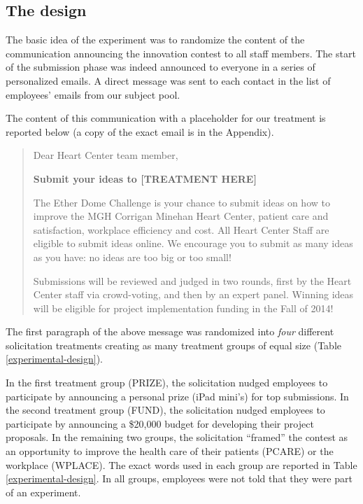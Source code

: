 \documentclass[11pt, titlepage]{article}
\begin{document}
\subsection{The design}\label{the-design}

The basic idea of the experiment was to randomize the content of the
communication announcing the innovation contest to all staff members.
The start of the submission phase was indeed announced to everyone in a
series of personalized emails. A direct message was sent to each contact
in the list of employees' emails from our subject pool.

The content of this communication with a placeholder for our treatment
is reported below (a copy of the exact email is in the Appendix).

\begin{quote}
Dear Heart Center team member,

\textbf{Submit your ideas to {[}TREATMENT HERE{]}}

The Ether Dome Challenge is your chance to submit ideas on how to
improve the MGH Corrigan Minehan Heart Center, patient care and
satisfaction, workplace efficiency and cost. All Heart Center Staff are
eligible to submit ideas online. We encourage you to submit as many
ideas as you have: no ideas are too big or too small!

Submissions will be reviewed and judged in two rounds, first by the
Heart Center staff via crowd-voting, and then by an expert panel.
Winning ideas will be eligible for project implementation funding in the
Fall of 2014!
\end{quote}

The first paragraph of the above message was randomized into \emph{four}
different solicitation treatments creating as many treatment groups of
equal size (Table \ref{experimental-design}).

In the first treatment group (PRIZE), the solicitation nudged employees
to participate by announcing a personal prize (iPad mini's) for top
submissions. In the second treatment group (FUND), the solicitation
nudged employees to participate by announcing a \$20,000 budget for
developing their project proposals. In the remaining two groups, the
solicitation ``framed'' the contest as an opportunity to improve the
health care of their patients (PCARE) or the workplace (WPLACE). The
exact words used in each group are reported in Table
\ref{experimental-design}. In all groups, employees were not told that
they were part of an experiment.
\end{document}
